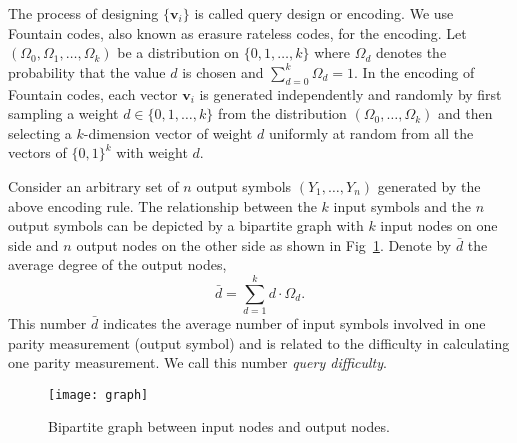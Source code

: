 \documentclass[11pt,onecolumn]{IEEEtran}
\newcommand{\beq}{\begin{equation}}
\newcommand{\eeq}{\end{equation}}
\newcommand{\bv}{\mathbf{v}}
\begin{document}
The process of designing $\{\mathbf{v}_i\}$ is called query design or encoding. We use Fountain codes, also known as erasure rateless codes, for the encoding. 
Let $(\Omega_0,\Omega_1,\dots, \Omega_k)$ be a distribution on $\{0,1,\dots, k\}$ where $\Omega_d$ denotes the probability that the value $d$ is chosen and $\sum_{d=0}^k \Omega_d=1$.  
In the encoding of Fountain codes, each vector $\mathbf{v}_i$ is generated independently and randomly by first sampling a weight $d\in\{0,1,\dots,k\}$ from the distribution $(\Omega_0,\dots, \Omega_k)$ and then selecting a $k$-dimension vector of weight $d$ uniformly at random from all the vectors of $\{0,1\}^k$ with weight $d$. %

Consider an arbitrary set of $n$ output symbols $(Y_1,\dots, Y_n)$ generated by the above encoding rule. The relationship between the $k$ input symbols and the $n$ output symbols can be depicted by a bipartite graph with $k$ input nodes on one side and $n$ output nodes on the other side as shown in Fig~\ref{fig:graph}.
Denote by $\bar{d}$ the average degree of the output nodes, 
\beq
\bar{d}=\sum_{d=1}^k d\cdot \Omega_d.
\eeq
This number $\bar{d}$ indicates the average number of input symbols involved in one parity measurement (output symbol) and is related to the difficulty in calculating one parity measurement. We call this number \emph{query difficulty}. 

\begin{figure}[t]
\centerline{\texttt{[image: graph]}}
\caption{Bipartite graph between input nodes and output nodes.}
\label{fig:graph}
\end{figure}
\end{document}
